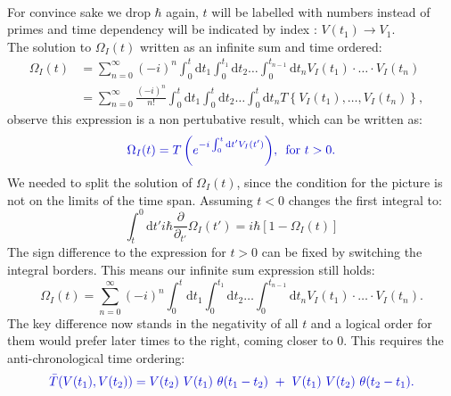 \documentclass[12pt, titlepage]{article}
\begin{document}
\\
For convince sake we drop $ \hbar $ again, $ t $ will be labelled with numbers instead of primes and time dependency will be indicated by index : $ V(t_1)\rightarrow V_{1} $.\\
The solution to $ \Omega_{I}(t) $ written as an infinite sum and time ordered:
\begin{subequations}
\begin{align}
\Omega_{I}(t) &=
\sum\limits_{n=0}^{\infty} 
(-i)^{n}
\int_{0}^{t}\mathrm{d}t_1\int_{0}^{t_{1}}\! \! \mathrm{d}t_2
 \ldots
 \int_{0}^{t_{n-1}}\! \! \mathrm{d}t_n
  V_{I}(t_1)\cdot \ldots \cdot V_{I}(t_n)
&\\
&=
\sum\limits_{n=0}^{\infty} 
\frac{(-i)^{n}}{n!}
\int_{0}^{t}\mathrm{d}t_1\int_{0}^{t}\! \! \mathrm{d}t_2
 \ldots
 \int_{0}^{t}\! \! \mathrm{d}t_n
 T\left\lbrace V_{I}(t_1), \ldots , V_{I}(t_n)\right\rbrace 
 ,
\end{align}
\end{subequations}
observe this expression is a non pertubative result, which can  be written as:
\begin{equation}\label{eq:Omega_I_Chron_0}
\textcolor[RGB]{0,0,204}{
\Omega_{I}(t)
=T\left( e^{-i\int_{0}^{t}\mathrm{d}t^{\prime} V_{I}(t^{\prime})} \right)
	\! ,\text{\enskip for  }  t>0 
	.}
\end{equation}
We needed to split the solution of $ \Omega_{I}(t)
 $, since the condition for the picture is not on the limits of the time span. Assuming $ t<0 $ changes the first integral to:
 \begin{equation}
 \int_{t}^{0}\mathrm{d}t'
 i\hbar 
 \frac{\partial}{\partial_{t'}} 
 \Omega_{I} (t')
 =
 i\hbar
 \left[ 
1 -\Omega_{I}(t)
 \right] 
 \end{equation}
The sign difference to the expression for $ t>0 $ can be fixed by switching the integral borders. This means our infinite sum expression still holds:
\begin{equation}
\Omega_{I}(t) =
\sum\limits_{n=0}^{\infty} 
(-i)^{n}
\int_{0}^{t}\mathrm{d}t_1\int_{0}^{t_{1}}\! \! \mathrm{d}t_2
 \ldots
 \int_{0}^{t_{n-1}}\! \! \mathrm{d}t_n
  V_{I}(t_1)\cdot \ldots \cdot V_{I}(t_n).
\end{equation}
The key difference now stands in the negativity of all $ t $ and a logical order for them would prefer later times to the right, coming closer to $ 0 $. This requires the anti-chronological time ordering:
 \begin{equation}\label{eq:anti-chron-time_ordering}
\textcolor[RGB]{0,0,204}{
\bar{T}(V(t_1), V(t_2))=V(t_2)\ V(t_1)\ \theta (t_1 -t_2)\ +\ V(t_1)\  V(t_2) \ \theta (t_2-t_1)
.}
\end{equation}
\end{document}
